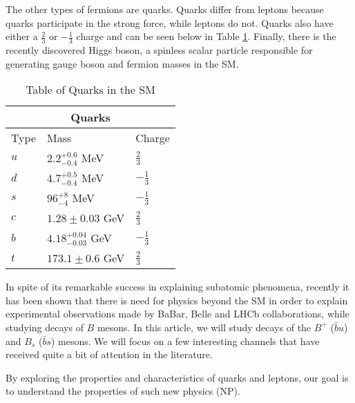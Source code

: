 \documentclass[12pt]{article}
\def \[{\left[}
\begin{document}
The other types of fermions are quarks. Quarks differ from leptons because quarks participate in the strong force, while leptons do not. Quarks also have either a $\frac{2}{3}$ or $-\frac{1}{3}$ charge and can be seen below in Table \ref{table:3}. Finally, there is the recently discovered Higgs boson, a spinless scalar particle responsible for generating gauge boson and fermion masses in the SM.
\begin{table}[htbp!]
\centering
\begin{tabular}{ |p{1cm}||p{4cm}|p{1.5cm}| }
 \hline
 \multicolumn{3}{|c|}{Quarks} \\
 \hline
 Type & Mass & Charge \\
 \hline
 $u$ & $2.2 ^{+0.6}_{\num{-0.4}}$ MeV & $\frac{2}{3}$ \\ [1ex]
 $d$ &  $4.7 ^{+0.5}_{\num{-0.4}}$ MeV & $-\frac{1}{3}$ \\ [1ex]
 $s$ &$96 ^{+8}_{\num{-4}}$ MeV & $-\frac{1}{3}$ \\[1ex]
 $c$ & $1.28 \pm 0.03$ GeV &$\frac{2}{3}$ \\[1ex]
 $b$ & $4.18 ^{+0.04}_{\num{-0.03}}$ GeV  &$-\frac{1}{3}$ \\[1ex]
 $t$ & $173.1 \pm 0.6$ GeV &$\frac{2}{3}$ \\[1ex]
 \hline 
\end{tabular}
\caption{Table of Quarks in the SM \cite{Agashe:2014kda}}
\label{table:3}
\end{table}

In spite of its remarkable success in explaining subatomic phenomena, recently it has been shown that there is need for physics beyond the SM in order to explain experimental observations made by BaBar, Belle and LHCb collaborations, while studying decays of $B$ mesons. In this article, we will study decays of the $B^+$ ($\bar{b}u$) and $B_s$ ($\bar{b}s$) mesons. We will focus on a few interesting channels that have received quite a bit of attention in the literature.



By exploring the properties and characteristics of quarks and leptons, our goal is to understand the properties of such new physics (NP).
\end{document}
